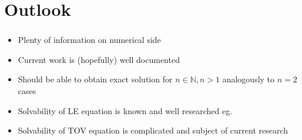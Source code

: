 \section{Outlook}

\begin{frame}
	\frametitle{\insertsection}
	\begin{itemize}%
		\item Plenty of information on numerical side
		\item Current work is (hopefully) well documented
		\item Should be able to obtain exact solution for $n\in\mathbb{N}, n>1$ analogously to $n=2$ cases
		\item Solvability of LE equation is known and well researched eg. \cite{quittnerSuperlinearParabolicProblems2007a}
		\item Solvability of TOV equation is complicated and subject of current research \cite{martinsExistenceClassificationPseudoAsymptotic2019, boonsermSolutionGeneratingTheorems2007}
	\end{itemize}
\end{frame}
